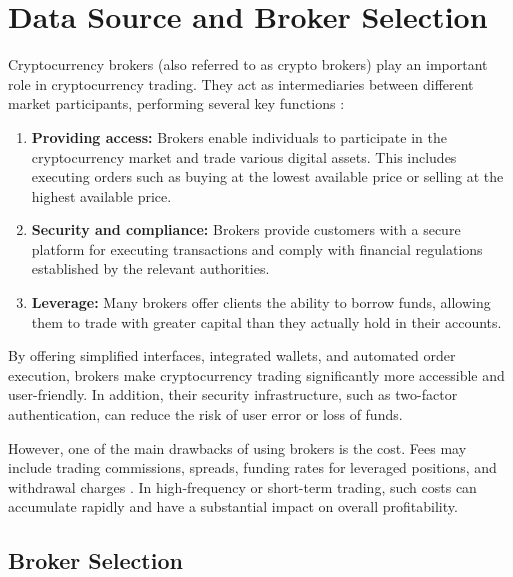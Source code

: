 \section{Data Source and Broker Selection}
\label{chap:broker}

Cryptocurrency brokers (also referred to as crypto brokers) play an important role in cryptocurrency trading.
They act as intermediaries between different market participants, performing several key functions \cite{binance-broker}:


\begin{enumerate}

    \item \textbf{Providing access:} Brokers enable individuals to participate in the cryptocurrency market and trade various digital assets.
    This includes executing orders such as buying at the lowest available price or selling at the highest available price.

    \item \textbf{Security and compliance:} Brokers provide customers with a secure platform for executing transactions and comply with financial regulations established by the relevant authorities.

    \item \textbf{Leverage:} Many brokers offer clients the ability to borrow funds, allowing them to trade with greater capital than they actually hold in their accounts.

\end{enumerate}


\noindent
By offering simplified interfaces, integrated wallets, and automated order execution, brokers make cryptocurrency trading significantly more accessible and user-friendly.
In addition, their security infrastructure, such as two-factor authentication, can reduce the risk of user error or loss of funds.


However, one of the main drawbacks of using brokers is the cost.
Fees may include trading commissions, spreads, funding rates for leveraged positions, and withdrawal charges \cite{broker-investing}.
In high-frequency or short-term trading, such costs can accumulate rapidly and have a substantial impact on overall profitability.


\subsection{Broker Selection}
\label{chap:broker-selection}


